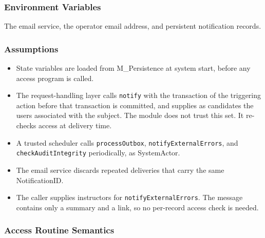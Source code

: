 \documentclass[12pt, titlepage]{article}
\begin{document}
\subsubsection{Environment Variables}

The email service, the operator email address, and persistent notification records.

\subsubsection{Assumptions}

\begin{itemize}
    \item State variables are loaded from M\_Persistence at system start, before any access program is called.
    \item The request-handling layer calls \texttt{notify} with the transaction of the triggering action before
    that transaction is committed, and supplies as candidates the users associated with the subject.
    The module does not trust this set. It re-checks access at delivery time.
    \item A trusted scheduler calls \texttt{processOutbox}, \texttt{notifyExternalErrors}, and \texttt{checkAuditIntegrity}
    periodically, as SystemActor.
    \item The email service discards repeated deliveries that carry the same NotificationID.
    \item The caller supplies instructors for \texttt{notifyExternalErrors}.
    The message contains only a summary and a link, so no per-record access check is needed.
\end{itemize}

\subsubsection{Access Routine Semantics}
\end{document}
